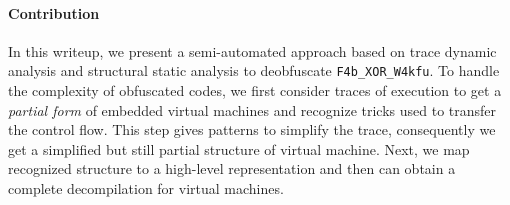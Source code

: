 \documentclass{easychair}
\begin{document}
\paragraph{Contribution}
In this writeup, we present a semi-automated approach based on trace dynamic analysis and structural static analysis to deobfuscate \texttt{F4b\_XOR\_W4kfu}. To handle the complexity of obfuscated codes, we first consider traces of execution to get a \emph{partial form} of embedded virtual machines and recognize tricks used to transfer the control flow. This step gives patterns to simplify the trace, consequently we get a simplified but still partial structure of virtual machine. Next, we map recognized structure to a high-level representation and then can obtain a complete decompilation for virtual machines. 

\end{document}
